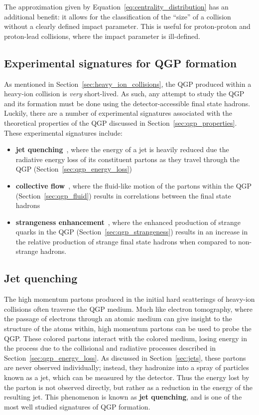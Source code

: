 The approximation given by Equation~\ref{eq:centrality_distribution} has an additional benefit: it allows for the classification of the ``size'' of a collision without a clearly defined impact parameter. This is useful for proton-proton and proton-lead collisions, where the impact parameter is ill-defined. 

\subsection{Experimental signatures for QGP formation}
\label{sec:qgp_evidence}

As mentioned in Section~\ref{sec:heavy_ion_collisions}, the QGP produced within a heavy-ion collision is \textit{very} short-lived. As such, any attempt to study the QGP and its formation must be done using the detector-accessible final state hadrons. Luckily, there are a number of experimental signatures associated with the theoretical properties of the QGP discussed in Section~\ref{sec:qgp_properties}. These experimental signatures include:
%
\begin{itemize}
    \item \textbf{jet quenching}~\cite{JetQuenching}, where the energy of a jet is heavily reduced due the radiative energy loss of its constituent partons as they travel through the QGP (Section~\ref{sec:qgp_energy_loss})
    \item \textbf{collective flow}~\cite{CollectiveFlow}, where the fluid-like motion of the partons within the QGP (Section~\ref{sec:qgp_fluid}) results in correlations between the final state hadrons
    \item \textbf{strangeness enhancement}~\cite{Strangeness}, where the enhanced production of strange quarks in the QGP (Section~\ref{sec:qgp_strangeness}) results in an increase in the relative production of strange final state hadrons when compared to non-strange hadrons.
\end{itemize}
%

\subsection{Jet quenching}
\label{sec:jet_quenching}

The high momentum partons produced in the initial hard scatterings of heavy-ion collisions often traverse the QGP medium. Much like electron tomography, where the passage of electrons through an atomic medium can give insight to the structure of the atoms within, high momentum partons can be used to probe the QGP. These colored partons interact with the colored medium, losing energy in the process due to the collisional and radiative processes described in Section~\ref{sec:qgp_energy_loss}. As discussed in Section~\ref{sec:jets}, these partons are never observed individually; instead, they hadronize into a spray of particles known as a jet, which can be measured by the detector. Thus the energy lost by the parton is not observed directly, but rather as a reduction in the energy of the resulting jet. This phenomenon is known as \textbf{jet quenching}, and is one of the most well studied signatures of QGP formation.

